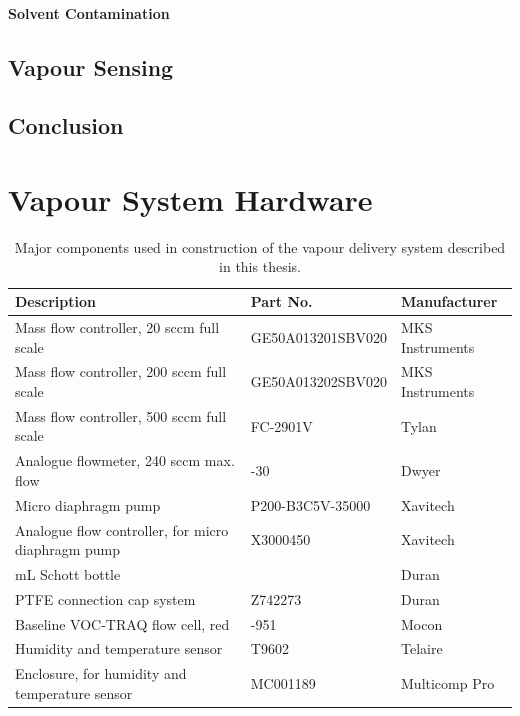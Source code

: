 \documentclass[
  a4paper,
]{scrbook}
\begin{document}
\hypertarget{solvent-contamination}{%
\subsubsection*{Solvent Contamination}\label{solvent-contamination}}

\hypertarget{vapour-sensing}{%
\section{Vapour Sensing}\label{vapour-sensing}}

\hypertarget{conclusion}{%
\section{Conclusion}\label{conclusion}}

\cleardoublepage
{}
{}
\appendix

\hypertarget{sec-vapour-sensor-components}{%
\chapter{Vapour System Hardware}\label{sec-vapour-sensor-components}}

\hypertarget{tbl-vapour-sensor-components}{}
\begin{longtable}[t]{>{\raggedright\arraybackslash}p{5.5cm}>{\raggedright\arraybackslash}p{4.5cm}>{\raggedright\arraybackslash}p{3.75cm}}
\caption{\label{tbl-vapour-sensor-components}Major components used in construction of the vapour delivery system
described in this thesis. }\tabularnewline

\toprule
Description & Part No. & Manufacturer\\
\midrule
Mass flow controller, 20 sccm full scale & GE50A013201SBV020 & MKS Instruments\\
Mass flow controller, 200 sccm full scale & GE50A013202SBV020 & MKS Instruments\\
Mass flow controller, 500 sccm full scale & FC-2901V & Tylan\\
Analogue flowmeter, 240 sccm max. flow & 116261-30 & Dwyer\\
Micro diaphragm pump & P200-B3C5V-35000 & Xavitech\\
\addlinespace
Analogue flow controller, for micro diaphragm pump & X3000450 & Xavitech\\
10 mL Schott bottle & 218010802 & Duran\\
PTFE connection cap system & Z742273 & Duran\\
Baseline VOC-TRAQ flow cell, red & 043-951 & Mocon\\
Humidity and temperature sensor & T9602 & Telaire\\
\addlinespace
Enclosure, for humidity and temperature sensor & MC001189 & Multicomp Pro\\
\bottomrule
\end{longtable}
\end{document}
